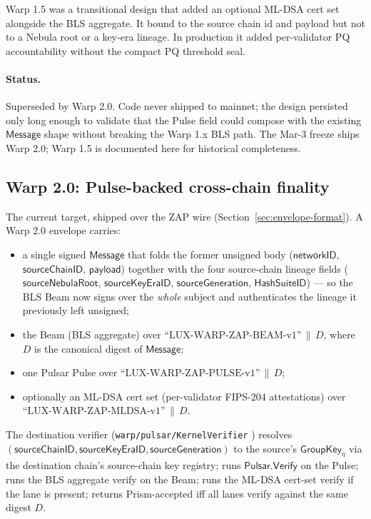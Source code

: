 Warp 1.5 was a transitional design that added an optional ML-DSA cert set alongside the BLS aggregate. It bound to the source chain id and payload but not to a Nebula root or a key-era lineage. In production it added per-validator PQ accountability without the compact PQ threshold seal.

\paragraph{Status.} Superseded by Warp 2.0. Code never shipped to mainnet; the design persisted only long enough to validate that the Pulse field could compose with the existing $\mathsf{Message}$ shape without breaking the Warp 1.x BLS path. The Mar-3 freeze ships Warp 2.0; Warp 1.5 is documented here for historical completeness.

\subsection{Warp 2.0: Pulse-backed cross-chain finality}

The current target, shipped over the ZAP wire (Section~\ref{sec:envelope-format}). A Warp 2.0 envelope carries:
\begin{itemize}[leftmargin=2em,nosep]
  \item a single signed $\mathsf{Message}$ that folds the former unsigned body ($\mathsf{networkID}$, $\mathsf{sourceChainID}$, $\mathsf{payload}$) together with the four source-chain lineage fields ($\mathsf{sourceNebulaRoot}$, $\mathsf{sourceKeyEraID}$, $\mathsf{sourceGeneration}$, $\mathsf{HashSuiteID}$) --- so the BLS Beam now signs over the \emph{whole} subject and authenticates the lineage it previously left unsigned;
  \item the Beam (BLS aggregate) over $\text{``LUX-WARP-ZAP-BEAM-v1''}\,\|\,D$, where $D$ is the canonical digest of $\mathsf{Message}$;
  \item one Pulsar Pulse over $\text{``LUX-WARP-ZAP-PULSE-v1''}\,\|\,D$;
  \item optionally an ML-DSA cert set (per-validator FIPS-204 attestations) over $\text{``LUX-WARP-ZAP-MLDSA-v1''}\,\|\,D$.
\end{itemize}

The destination verifier (\texttt{warp/pulsar/KernelVerifier} \cite{warpgo}) resolves $(\mathsf{sourceChainID}, \mathsf{sourceKeyEraID}, \mathsf{sourceGeneration})$ to the source's $\mathsf{GroupKey}_\eta$ via the destination chain's source-chain key registry; runs $\mathsf{Pulsar.Verify}$ on the Pulse; runs the BLS aggregate verify on the Beam; runs the ML-DSA cert-set verify if the lane is present; returns Prism-accepted iff all lanes verify against the same digest $D$.

